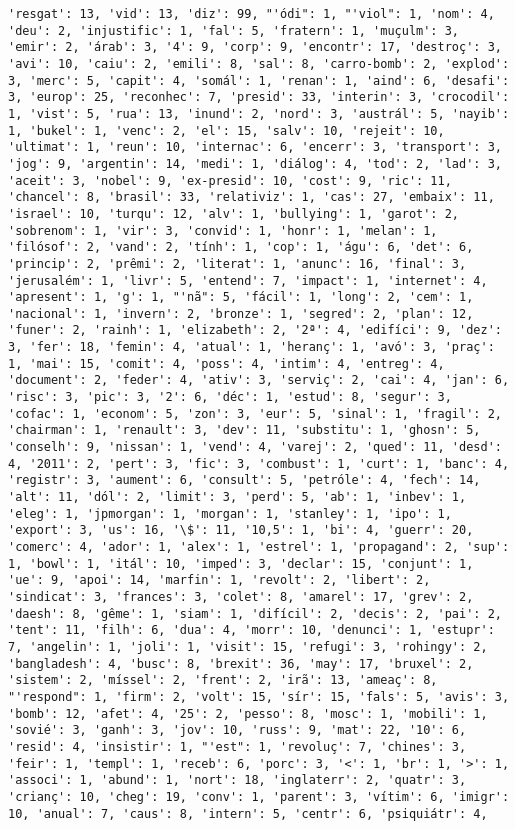 \documentclass[11pt]{article}
\begin{document}
\begin{Verbatim}[commandchars=\\\{\}]
'resgat': 13, 'vid': 13, 'diz': 99, "'ódi": 1, "'viol": 1, 'nom': 4, 'deu': 2, 'injustific': 1, 'fal': 5, 'fratern': 1, 'muçulm': 3, 'emir': 2, 'árab': 3, '4': 9, 'corp': 9, 'encontr': 17, 'destroç': 3, 'avi': 10, 'caiu': 2, 'emili': 8, 'sal': 8, 'carro-bomb': 2, 'explod': 3, 'merc': 5, 'capit': 4, 'somál': 1, 'renan': 1, 'aind': 6, 'desafi': 3, 'europ': 25, 'reconhec': 7, 'presid': 33, 'interin': 3, 'crocodil': 1, 'vist': 5, 'rua': 13, 'inund': 2, 'nord': 3, 'austrál': 5, 'nayib': 1, 'bukel': 1, 'venc': 2, 'el': 15, 'salv': 10, 'rejeit': 10, 'ultimat': 1, 'reun': 10, 'internac': 6, 'encerr': 3, 'transport': 3, 'jog': 9, 'argentin': 14, 'medi': 1, 'diálog': 4, 'tod': 2, 'lad': 3, 'aceit': 3, 'nobel': 9, 'ex-presid': 10, 'cost': 9, 'ric': 11, 'chancel': 8, 'brasil': 33, 'relativiz': 1, 'cas': 27, 'embaix': 11, 'israel': 10, 'turqu': 12, 'alv': 1, 'bullying': 1, 'garot': 2, 'sobrenom': 1, 'vir': 3, 'convid': 1, 'honr': 1, 'melan': 1, 'filósof': 2, 'vand': 2, 'tính': 1, 'cop': 1, 'águ': 6, 'det': 6, 'princip': 2, 'prêmi': 2, 'literat': 1, 'anunc': 16, 'final': 3, 'jerusalém': 1, 'livr': 5, 'entend': 7, 'impact': 1, 'internet': 4, 'apresent': 1, 'g': 1, "'nã": 5, 'fácil': 1, 'long': 2, 'cem': 1, 'nacional': 1, 'invern': 2, 'bronze': 1, 'segred': 2, 'plan': 12, 'funer': 2, 'rainh': 1, 'elizabeth': 2, '2ª': 4, 'edifíci': 9, 'dez': 3, 'fer': 18, 'femin': 4, 'atual': 1, 'heranç': 1, 'avó': 3, 'praç': 1, 'mai': 15, 'comit': 4, 'poss': 4, 'intim': 4, 'entreg': 4, 'document': 2, 'feder': 4, 'ativ': 3, 'serviç': 2, 'cai': 4, 'jan': 6, 'risc': 3, 'pic': 3, '2': 6, 'déc': 1, 'estud': 8, 'segur': 3, 'cofac': 1, 'econom': 5, 'zon': 3, 'eur': 5, 'sinal': 1, 'fragil': 2, 'chairman': 1, 'renault': 3, 'dev': 11, 'substitu': 1, 'ghosn': 5, 'conselh': 9, 'nissan': 1, 'vend': 4, 'varej': 2, 'qued': 11, 'desd': 4, '2011': 2, 'pert': 3, 'fic': 3, 'combust': 1, 'curt': 1, 'banc': 4, 'registr': 3, 'aument': 6, 'consult': 5, 'petróle': 4, 'fech': 14, 'alt': 11, 'dól': 2, 'limit': 3, 'perd': 5, 'ab': 1, 'inbev': 1, 'eleg': 1, 'jpmorgan': 1, 'morgan': 1, 'stanley': 1, 'ipo': 1, 'export': 3, 'us': 16, '\$': 11, '10,5': 1, 'bi': 4, 'guerr': 20, 'comerc': 4, 'ador': 1, 'alex': 1, 'estrel': 1, 'propagand': 2, 'sup': 1, 'bowl': 1, 'itál': 10, 'imped': 3, 'declar': 15, 'conjunt': 1, 'ue': 9, 'apoi': 14, 'marfin': 1, 'revolt': 2, 'libert': 2, 'sindicat': 3, 'frances': 3, 'colet': 8, 'amarel': 17, 'grev': 2, 'daesh': 8, 'gême': 1, 'siam': 1, 'difícil': 2, 'decis': 2, 'pai': 2, 'tent': 11, 'filh': 6, 'dua': 4, 'morr': 10, 'denunci': 1, 'estupr': 7, 'angelin': 1, 'joli': 1, 'visit': 15, 'refugi': 3, 'rohingy': 2, 'bangladesh': 4, 'busc': 8, 'brexit': 36, 'may': 17, 'bruxel': 2, 'sistem': 2, 'míssel': 2, 'frent': 2, 'irã': 13, 'ameaç': 8, "'respond": 1, 'firm': 2, 'volt': 15, 'sír': 15, 'fals': 5, 'avis': 3, 'bomb': 12, 'afet': 4, '25': 2, 'pesso': 8, 'mosc': 1, 'mobili': 1, 'sovié': 3, 'ganh': 3, 'jov': 10, 'russ': 9, 'mat': 22, '10': 6, 'resid': 4, 'insistir': 1, "'est": 1, 'revoluç': 7, 'chines': 3, 'feir': 1, 'templ': 1, 'receb': 6, 'porc': 3, '<': 1, 'br': 1, '>': 1, 'associ': 1, 'abund': 1, 'nort': 18, 'inglaterr': 2, 'quatr': 3, 'crianç': 10, 'cheg': 19, 'conv': 1, 'parent': 3, 'vítim': 6, 'imigr': 10, 'anual': 7, 'caus': 8, 'intern': 5, 'centr': 6, 'psiquiátr': 4, 
\end{Verbatim}
\end{document}
